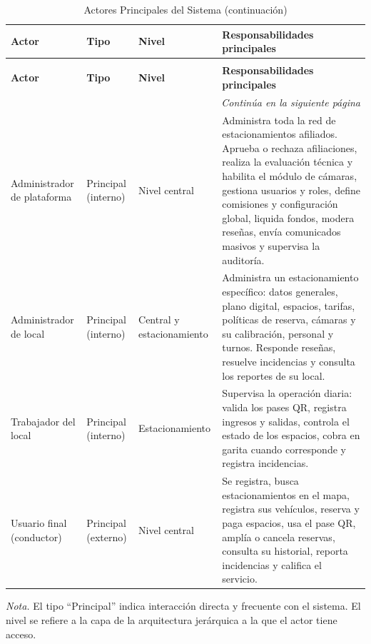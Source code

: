 \begin{longtable}{p{2.8cm} p{2cm} p{2.5cm} p{6.5cm}}
\caption{Actores Principales del Sistema} \\
\toprule
\textbf{Actor} & \textbf{Tipo} & \textbf{Nivel} & \textbf{Responsabilidades principales} \\
\midrule
\endfirsthead

\caption[]{Actores Principales del Sistema (continuación)} \\
\toprule
\textbf{Actor} & \textbf{Tipo} & \textbf{Nivel} & \textbf{Responsabilidades principales} \\
\midrule
\endhead

\midrule
\multicolumn{4}{r}{\footnotesize\textit{Continúa en la siguiente página}} \\
\endfoot

\bottomrule
\endlastfoot

Administrador de plataforma & Principal (interno) & Nivel central & Administra toda la red de estacionamientos afiliados. Aprueba o rechaza afiliaciones, realiza la evaluación técnica y habilita el módulo de cámaras, gestiona usuarios y roles, define comisiones y configuración global, liquida fondos, modera reseñas, envía comunicados masivos y supervisa la auditoría. \\
\midrule
Administrador de local & Principal (interno) & Central y estacionamiento & Administra un estacionamiento específico: datos generales, plano digital, espacios, tarifas, políticas de reserva, cámaras y su calibración, personal y turnos. Responde reseñas, resuelve incidencias y consulta los reportes de su local. \\
\midrule
Trabajador del local & Principal (interno) & Estacionamiento & Supervisa la operación diaria: valida los pases QR, registra ingresos y salidas, controla el estado de los espacios, cobra en garita cuando corresponde y registra incidencias. \\
\midrule
Usuario final (conductor) & Principal (externo) & Nivel central & Se registra, busca estacionamientos en el mapa, registra sus vehículos, reserva y paga espacios, usa el pase QR, amplía o cancela reservas, consulta su historial, reporta incidencias y califica el servicio. \\
\end{longtable}

\textit{Nota.} El tipo ``Principal'' indica interacción directa y frecuente con el sistema. El nivel se refiere a la capa de la arquitectura jerárquica a la que el actor tiene acceso.

